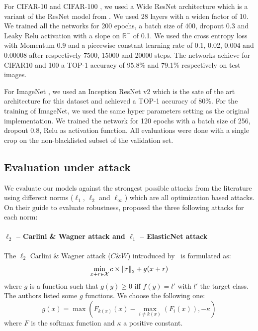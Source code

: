 For CIFAR-10 and CIFAR-100 \cite{krizhevsky2009learning}, we used a Wide ResNet architecture \cite{ZagoruykoK16} which is a variant of the ResNet model from \cite{He_2016_CVPR}.
We used 28 layers with a widen factor of 10.
We trained all the networks for 200 epochs, a batch size of 400, dropout 0.3 and Leaky Relu activation with a slope on $\mathbb{R}^-$ of 0.1. We used the cross entropy loss with Momentum 0.9 and  a piecewise constant learning rate of 0.1, 0.02, 0.004 and 0.00008 after respectively 7500, 15000 and 20000 steps.
The networks achieve for CIFAR10 and 100 a TOP-1 accuracy of 95.8\% and 79.1\% respectively on test images. 

For ImageNet \cite{imagenet_cvpr09}, we used an Inception ResNet v2 \cite{szegedy2017inception} which is the sate of the art architecture for this dataset and achieved a TOP-1 accuracy of 80\%.
For the training of ImageNet, we used the same hyper parameters setting as the original implementation.
We trained the network for 120 epochs with a batch size of 256, dropout 0.8, Relu as activation function.
All evaluations were done with a single crop on the non-blacklisted subset of the validation set.


\subsection{Evaluation under attack}

We evaluate our models against the strongest possible attacks from the literature using different norms ($\ell_1$, $\ell_2$ and $\ell_\infty$) which are all optimization based attacks.
On their guide to evaluate robustness, \citet{carlini2019evaluating} proposed the three following attacks for each norm: 

\paragraph{$\ell_2$ -- Carlini \& Wagner attack and $\ell_1$ -- ElasticNet attack}
The $\ell_2$ Carlini \& Wagner attack ($C\&W$) introduced by~\citet{carlini2017towards} is formulated as:
\begin{equation}
  \min_{x+r\in \mathcal{X} } c \times \norm{r}_2+g(x+r)
\end{equation}
where $g$ is a function such that $g(y)\geq 0$ iff $f(y)=l'$ with $l'$ the target class.
The authors listed some $g$ functions.
We choose the following one:
\begin{equation}
  g(x)=\max(F_{k(x)}(x)-\max_{i\neq k(x)}(F_i(x)),-\kappa)
\end{equation}
where $F$ is the softmax function and $\kappa$ a positive constant.

